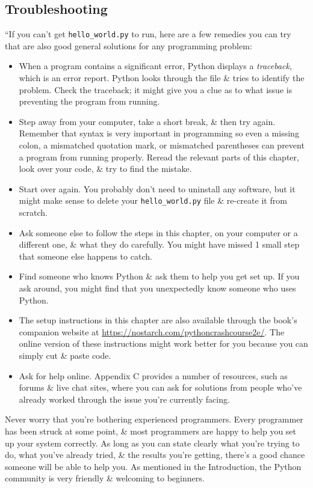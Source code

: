 \documentclass[oneside]{book}
\numberwithin{equation}{section}
\begin{document}
\subsection{Troubleshooting}
``If you can't get \verb|hello_world.py| to run, here are a few remedies you can try that are also good general solutions for any programming problem:
\begin{itemize}
	\item When a program contains a significant error, Python displays a \textit{traceback}, which is an error report. Python looks through the file \& tries to identify the problem. Check the traceback; it might give you a clue as to what issue is preventing the program from running.
	\item Step away from your computer, take a short break, \& then try again. Remember that syntax is very important in programming so even a missing colon, a mismatched quotation mark, or mismatched parentheses can prevent a program from running properly. Reread the relevant parts of this chapter, look over your code, \& try to find the mistake.
	\item Start over again. You probably don't need to uninstall any software, but it might make sense to delete your \verb|hello_world.py| file \& re-create it from scratch.
	\item Ask someone else to follow the steps in this chapter, on your computer or a different one, \& what they do carefully. You might have missed 1 small step that someone else happens to catch.
	\item Find someone who knows Python \& ask them to help you get set up. If you ask around, you might find that you unexpectedly know someone who uses Python.
	\item The setup instructions in this chapter are also available through the book's companion website at \url{https://nostarch.com/pythoncrashcourse2e/}. The online version of these instructions might work better for you because you can simply cut \& paste code.
	\item Ask for help online. Appendix C provides a number of resources, such as forums \& live chat sites, where you can ask for solutions from people who've already worked through the issue you're currently facing.
\end{itemize}
Never worry that you're bothering experienced programmers. Every programmer has been struck at some point, \& most programmers are happy to help you set up your system correctly. As long as you can state clearly what you're trying to do, what you've already tried, \& the results you're getting, there's a good chance someone will be able to help you. As mentioned in the Introduction, the Python community is very friendly \& welcoming to beginners.
\end{document}
